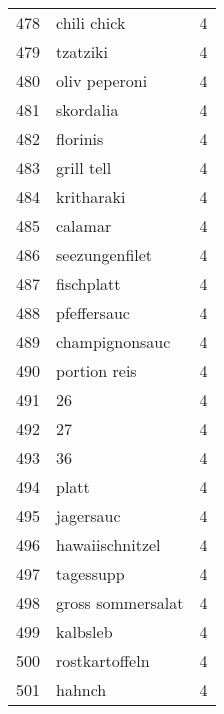\begin{tabular}{llr}
478  &                                        chili chick &      4 \\
479  &                                           tzatziki &      4 \\
480  &                                      oliv peperoni &      4 \\
481  &                                          skordalia &      4 \\
482  &                                           florinis &      4 \\
483  &                                         grill tell &      4 \\
484  &                                         kritharaki &      4 \\
485  &                                            calamar &      4 \\
486  &                                     seezungenfilet &      4 \\
487  &                                         fischplatt &      4 \\
488  &                                        pfeffersauc &      4 \\
489  &                                     champignonsauc &      4 \\
490  &                                       portion reis &      4 \\
491  &                                                 26 &      4 \\
492  &                                                 27 &      4 \\
493  &                                                 36 &      4 \\
494  &                                              platt &      4 \\
495  &                                          jagersauc &      4 \\
496  &                                    hawaiischnitzel &      4 \\
497  &                                          tagessupp &      4 \\
498  &                                  gross sommersalat &      4 \\
499  &                                           kalbsleb &      4 \\
500  &                                     rostkartoffeln &      4 \\
501  &                                             hahnch &      4 \\

\end{tabular}
